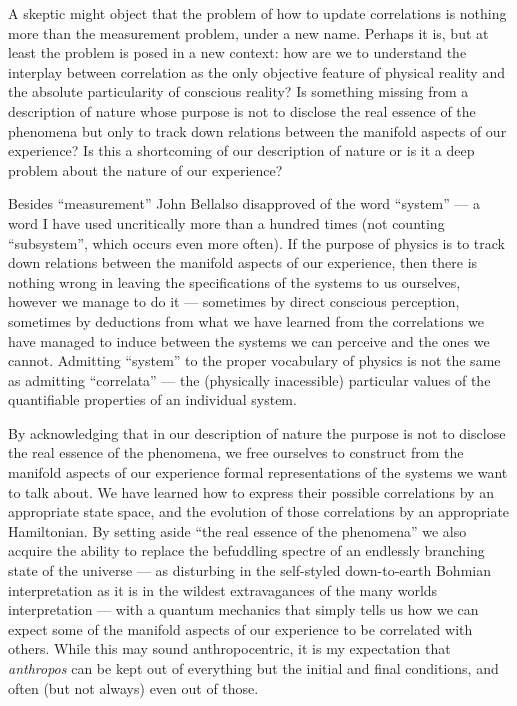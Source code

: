 A skeptic might object that the problem of how to update correlations
is nothing more than the measurement problem, under a new name.
Perhaps it is, but at least the problem is posed in a new context: how
are we to understand the interplay between correlation as the only
objective feature of physical reality and the absolute particularity
of conscious reality?  Is something missing from a description of
nature whose purpose is not to disclose the real essence of the
phenomena but only to track down relations between the manifold
aspects of our experience?  Is this a shortcoming of our description
of nature or is it a deep problem about the nature of our experience?

Besides ``measurement'' John Bell\fn also disapproved of the word ``system'' --- a word I have
used uncritically more than a hundred times (not counting
``subsystem'', which occurs even more often).  If the purpose of
physics is to track down relations between the manifold aspects of our
experience, then there is nothing wrong in leaving the specifications
of the systems to us ourselves, however we manage to do it ---
sometimes by direct conscious perception, sometimes by deductions from
what we have learned from the correlations we have managed to induce
between the systems we can perceive and the ones we cannot.  Admitting
``system'' to the proper vocabulary of physics is not the same as
admitting ``correlata'' --- the (physically inacessible) particular
values of the quantifiable properties of an individual system.  

By acknowledging that in our description of nature the purpose is not
to disclose the real essence of the phenomena, we free ourselves to
construct from the manifold aspects of our experience formal
representations of the systems we want to talk about.  We have learned
how to express their possible correlations by an appropriate state
space, and the evolution of those correlations by an appropriate
Hamiltonian.  By setting aside ``the real essence of the phenomena''
we also acquire the ability to replace the befuddling spectre of an
endlessly branching state of the universe --- as disturbing in the
self-styled down-to-earth Bohmian interpretation as it is in the
wildest extravagances of the many worlds interpretation --- with a
quantum mechanics that simply tells us how we can expect some of the
manifold aspects of our experience to be correlated with others.
While this may sound anthropocentric, it is my expectation that {\it
anthropos\/} can be kept out of everything but the initial and final
conditions, and often (but not always) even out of those.

